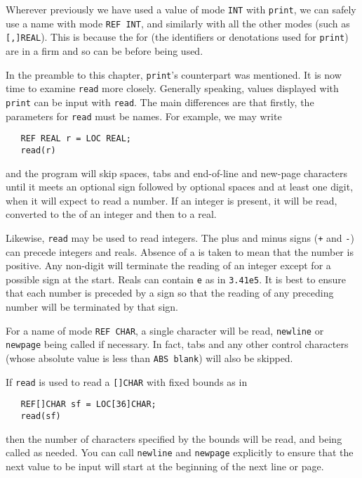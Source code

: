 Wherever previously we have used a value of mode \verb|INT| with
\verb|print|, we can safely use a name with mode \verb|REF INT|, and
similarly with all the other modes (such as \verb|[,]REAL|). This is
because the  for  (the
identifiers or denotations used for \verb|print|) are in a firm
 and so can be
 before being used.

In the preamble to this chapter, \verb|print|'s counterpart
 was mentioned. It is now time to examine \verb|read| more
closely. Generally speaking, values displayed with \verb|print| can
be input with \verb|read|. The main differences are that firstly, the
parameters for \verb|read| must be names. For example, we may write
\begin{verbatim}
   REF REAL r = LOC REAL;
   read(r)
\end{verbatim}
\noindent
and the program will skip spaces, tabs and end-of-line and new-page
characters until it meets an optional sign followed by optional
spaces and at least one digit, when it will expect to read a number.
If an integer is present, it will be read, converted to the
 of an integer and then
 to a real.

Likewise, \verb|read| may be used to read integers.  The plus and minus
signs (\verb|+| and \verb|-|) can precede integers and reals.  Absence
of a  is taken to mean that the number is positive. Any
non-digit will terminate the reading of an integer except for a
possible sign at the start. Reals can contain \verb|e| as in
\verb|3.41e5|. It is best to ensure that each number is preceded by a
sign so that the reading of any preceding number will be terminated by
that sign.

For a name of mode \verb|REF CHAR|, a single character will be read,
\verb|newline| or \verb|newpage| being called if necessary. In fact,
tabs and any other control characters (whose absolute value is less
than \verb|ABS blank|) will also be skipped.

If \verb|read| is used to read a \verb|[]CHAR| with fixed bounds as in
\begin{verbatim}
   REF[]CHAR sf = LOC[36]CHAR;
   read(sf)
\end{verbatim}
\noindent
then the number of characters specified by the bounds will be read,
 and  being called as needed. You can
call \verb|newline| and \verb|newpage| explicitly to ensure that the
next value to be input will start at the beginning of the next line
or page.

